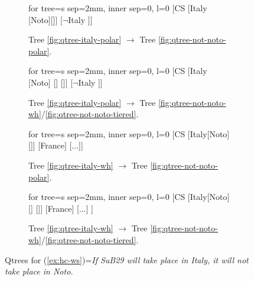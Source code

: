 \begin{figure}[H]
\setlength{\fboxsep}{1pt}
\renewcommand\thefigure{\ref{fig:qtrees-if-italy-not-noto}}
\centering
\begin{subfigure}[b]{.23\linewidth}
	\centering
	\scalebox{.8}
	{\begin{forest}for tree={s sep=2mm, inner sep=0, l=0}
			[CS [{Italy} [Noto][]] [{$\neg$Italy} ]]
	\end{forest}}
	\caption{Tree \ref{fig:qtree-italy-polar} $\rightarrow$ Tree \ref{fig:qtree-not-noto-polar}.}\label{ex:qtree-if-italy-not-noto-polar-polar-2}
\end{subfigure}\hfill
\begin{subfigure}[b]{.25\linewidth}
	\centering
	\scalebox{.8}
	{\begin{forest}for tree={s sep=2mm, inner sep=0, l=0}
			[CS [{Italy} [{Noto}] [] []] [{$\neg$Italy} ]]
	\end{forest}}
	\caption{Tree \ref{fig:qtree-italy-polar} $\rightarrow$ Tree \ref{fig:qtree-not-noto-wh}/\ref{fig:qtree-not-noto-tiered}.}\label{ex:qtree-if-italy-not-noto-polar-wh-2}
\end{subfigure}
\hfill
\begin{subfigure}[b]{.25\linewidth}
	\centering
	\scalebox{.8}
	{\begin{forest}for tree={s sep=2mm, inner sep=0, l=0}
			[CS [Italy[Noto][]] [France] [...]]
	\end{forest}}
	\caption{Tree \ref{fig:qtree-italy-wh} $\rightarrow$ Tree \ref{fig:qtree-not-noto-polar}.}\label{ex:qtree-if-italy-not-noto-wh-polar-2}
\end{subfigure}\hfill
\begin{subfigure}[b]{.25\linewidth}
	\centering
	\scalebox{.8}
	{\begin{forest}for tree={s sep=2mm, inner sep=0, l=0}
			[CS [Italy[{Noto}] [] []] [France] [...] ]
	\end{forest}}
	\caption{Tree \ref{fig:qtree-italy-wh} $\rightarrow$ Tree \ref{fig:qtree-not-noto-wh}/\ref{fig:qtree-not-noto-tiered}.}\label{ex:qtree-if-italy-not-noto-wh-wh-2}
\end{subfigure}
\caption{Qtrees for (\ref{ex:hc-ws})=\textit{If SuB29 will take place in Italy, it will not take place in Noto.}}\label{ex:qtree-if-italy-not-noto-2}
\end{figure}

